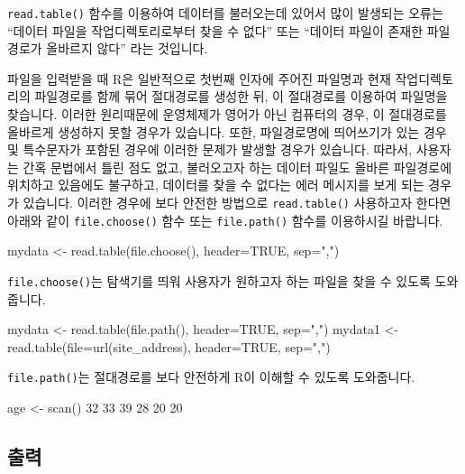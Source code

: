 \documentclass{report}
\begin{document}
\texttt{read.table()} 함수를 이용하여 데이터를 불러오는데 있어서 많이 발생되는 오류는 ``데이터 파일을 작업디렉토리로부터 찾을 수 없다'' 또는 ``데이터 파일이 존재한 파일경로가 올바르지 않다'' 라는 것입니다. 

파일을 입력받을 때 R은 일반적으로 첫번째 인자에 주어진 파일명과 현재 작업디렉토리의 파일경로를 함께 묶어 절대경로를 생성한 뒤, 이 절대경로를 이용하여 파일명을 찾습니다. 
이러한 원리때문에 운영체제가 영어가 아닌 컴퓨터의 경우, 이 절대경로를 올바르게 생성하지 못할 경우가 있습니다. 
또한, 파일경로명에 띄어쓰기가 있는 경우 및 특수문자가 포함된 경우에 이러한 문제가 발생할 경우가 있습니다. 
따라서, 사용자는 간혹 문법에서 틀린 점도 없고, 불러오고자 하는 데이터 파일도 올바른 파일경로에 위치하고 있음에도 불구하고, 데이터를 찾을 수 없다는 에러 메시지를 보게 되는 경우가 있습니다. 
이러한 경우에 보다 안전한 방법으로 \texttt{read.table()} 사용하고자 한다면 아래와 같이 \texttt{file.choose()} 함수 또는 \texttt{file.path()} 함수를 이용하시길 바랍니다.

\begin{Schunk}
\begin{Soutput}
mydata <- read.table(file.choose(), header=TRUE, sep=",")
\end{Soutput}
\end{Schunk}

\texttt{file.choose()}는 탐색기를 띄워 사용자가 원하고자 하는 파일을 찾을 수 있도록 도와줍니다. 

\begin{Schunk}
\begin{Soutput}
mydata <- read.table(file.path(), header=TRUE, sep=",")
mydata1 <- read.table(file=url(site_address), header=TRUE, sep=",")
\end{Soutput}
\end{Schunk}

\texttt{file.path()}는 절대경로를 보다 안전하게 R이 이해할 수 있도록 도와줍니다. 



\begin{Schunk}
\begin{Soutput}
age <- scan()
32 33 39 28 20 20

\end{Soutput}
\end{Schunk}


\subsection{출력}
\end{document}
